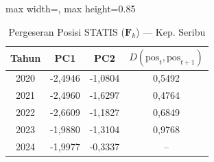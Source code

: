 \begin{table}[H]
\centering
\caption{Pergeseran Posisi STATIS ($\mathbf{F}_k$) --- Kep. Seribu} \label{tab:app1jarak_statis_skor_kep_seribu}
\begin{adjustbox}{max width=\textwidth, max height=0.85\textheight}
\begin{tabular}{|c|c|c|c|}
\hline
\textbf{Tahun} & \textbf{PC1} & \textbf{PC2} & \textbf{$D(\text{pos}_t, \text{pos}_{t+1})$} \\
\hline
2020 & -2,4946 & -1,0804 & 0,5492 \\
2021 & -2,4960 & -1,6297 & 0,4764 \\
2022 & -2,6609 & -1,1827 & 0,6849 \\
2023 & -1,9880 & -1,3104 & 0,9768 \\
2024 & -1,9977 & -0,3337 & -- \\
\hline
\end{tabular}
\end{adjustbox}
\end{table}